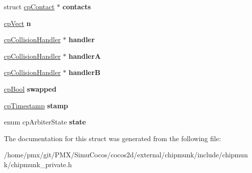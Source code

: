 \begin{DoxyCompactItemize}
\item 
\mbox{\label{structcpArbiter_ac55a2c7754dd2c45814730d5fbe3c036}} 
struct \hyperlink{structcpContact}{cp\+Contact} $\ast$ {\bfseries contacts}
\item 
\mbox{\label{structcpArbiter_a74be8aab017a21f5a2ff1dd1a233a3b3}} 
\hyperlink{structcpVect}{cp\+Vect} {\bfseries n}
\item 
\mbox{\label{structcpArbiter_ad1eb59e52f33925702940df94d555114}} 
\hyperlink{structcpCollisionHandler}{cp\+Collision\+Handler} $\ast$ {\bfseries handler}
\item 
\mbox{\label{structcpArbiter_aa089aee327ce057cbbd7868403a929e4}} 
\hyperlink{structcpCollisionHandler}{cp\+Collision\+Handler} $\ast$ {\bfseries handlerA}
\item 
\mbox{\label{structcpArbiter_aa983a7ae64a50b5ca095a47605379e4a}} 
\hyperlink{structcpCollisionHandler}{cp\+Collision\+Handler} $\ast$ {\bfseries handlerB}
\item 
\mbox{\label{structcpArbiter_a05eb6f37d1e8b27dcfbccd79d5773495}} 
\hyperlink{group__basicTypes_gabc5e752c48f3449ca26ef413ecbd647e}{cp\+Bool} {\bfseries swapped}
\item 
\mbox{\label{structcpArbiter_a7c724b956f3d7b91f6aa1d73d886b56c}} 
\hyperlink{group__basicTypes_gaa24652c104082d0725066ea5ac7dc83f}{cp\+Timestamp} {\bfseries stamp}
\item 
\mbox{\label{structcpArbiter_a972953b321f437fbc5000539cc7e3b1e}} 
enum cp\+Arbiter\+State {\bfseries state}
\end{DoxyCompactItemize}


The documentation for this struct was generated from the following file\+:\begin{DoxyCompactItemize}
\item 
/home/pmx/git/\+P\+M\+X/\+Simu\+Cocos/cocos2d/external/chipmunk/include/chipmunk/chipmunk\+\_\+private.\+h\end{DoxyCompactItemize}
